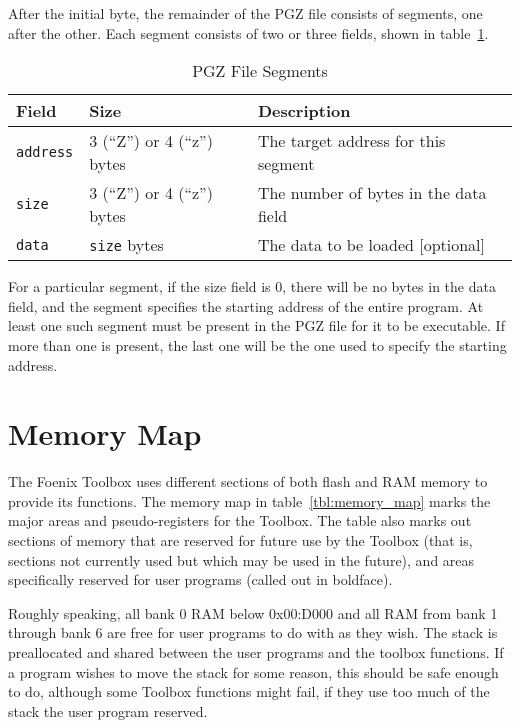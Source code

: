 After the initial byte, the remainder of the PGZ file consists of segments, one after the other. Each segment consists of two or three fields,
shown in table~\ref{tbl:pgz_file_segments}.

\begin{table}
	\begin{center}
		\begin{tabular}{|l|l|l|} \hline
			Field &	Size & Description \\ \hline\hline
			\verb+address+ & 3 (“Z”) or 4 (“z”) bytes & The target address for this segment \\ \hline
			\verb+size+ & 3 (“Z”) or 4 (“z”) bytes & The number of bytes in the data field \\ \hline
			\verb+data+ & \verb+size+ bytes & The data to be loaded [optional] \\ \hline
		\end{tabular}
	\end{center}
	\caption{PGZ File Segments}
	\label{tbl:pgz_file_segments}
\end{table}

For a particular segment, if the size field is 0, there will be no bytes in the data field,
and the segment specifies the starting address of the entire program.
At least one such segment must be present in the PGZ file for it to be executable.
If more than one is present, the last one will be the one used to specify the starting address.

\section{Memory Map}
The Foenix Toolbox uses different sections of both flash and RAM memory to provide its functions.
The memory map in table~\ref{tbl:memory_map} marks the major areas and pseudo-registers for the Toolbox.
The table also marks out sections of memory that are reserved for future use by the Toolbox (that is,
sections not currently used but which may be used in the future), and areas specifically reserved for user
programs (called out in boldface).

Roughly speaking, all bank 0 RAM below 0x00:D000 and all RAM from bank 1 through bank 6 are free for user programs
to do with as they wish. The stack is preallocated and shared between the user programs and the toolbox functions.
If a program wishes to move the stack for some reason, this should be safe enough to do, although some Toolbox functions
might fail, if they use too much of the stack the user program reserved.


